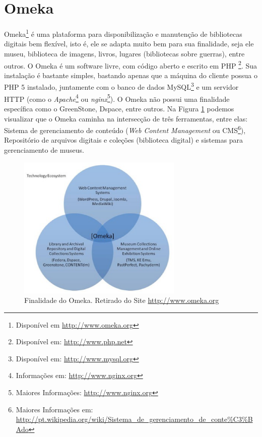 \section*{Omeka}
\label{sub:omeka}

Omeka\footnote{Disponível em \url{http://www.omeka.org}} é uma plataforma para disponibilização e manutenção de  bibliotecas digitais bem flexível, isto é, ele se adapta muito bem para sua finalidade, seja ele museu, biblioteca de imagens, livros, lugares (bibliotecas sobre guerras), entre outros. O Omeka é um software livre, com código aberto e escrito em PHP \footnote{Disponível em: \url{http://www.php.net}}. Sua instalação é bastante simples, bastando apenas que a máquina do cliente possua o PHP 5 instalado, juntamente com o banco de dados MySQL\footnote{Disponível em: \url{http://www.mysql.org}} e um servidor HTTP (como o \textit{Apache}\footnote{Informações em: \url{http://www.nginx.org}} ou \textit{nginx}\footnote{Maiores Informações: \url{http://www.nginx.org}}). O Omeka não possui uma finalidade específica como o GreenStone, Dspace, entre outros. Na Figura \ref{fig:finalidadeomeka} podemos visualizar que o Omeka caminha na intersecção de três ferramentas, entre elas: Sistema de gerenciamento de conteúdo (\textit{Web Content Management} ou CMS\footnote{Maiores Informações em: \url{http://pt.wikipedia.org/wiki/Sistema_de_gerenciamento_de_conte\%C3\%BAdo}}), Repositório de arquivos digitais e coleções (biblioteca digital) e sistemas para gerenciamento de museus.

\graphicspath{{figuras/}}
\begin{figure}[H]
\centering
\includegraphics[width=0.7\textwidth]{finalidade_omeka}
\caption[Finalidade do Omeka]{Finalidade do Omeka. Retirado do Site \url{http://www.omeka.org}}
\label{fig:finalidadeomeka}
\end{figure}

